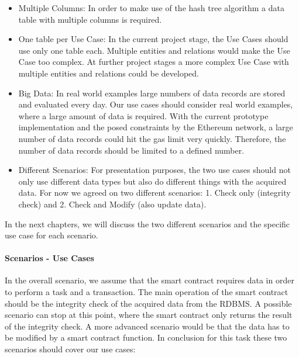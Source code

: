 \begin{itemize}
\item Multiple Columns:
In order to make use of the hash tree algorithm a data table with multiple columns is required.
\item One table per Use Case:
In the current project stage, the Use Cases should use only one table each. Multiple entities and relations would make the Use Case too complex. At further project stages a more complex Use Case with multiple entities and relations could be developed.
\item Big Data:
In real world examples large numbers of data records are stored and evaluated every day. Our use cases should consider real world examples, where a large amount of data is required. With the current prototype implementation and the posed constraints by the Ethereum network, a large number of data records could hit the gas limit very quickly. Therefore, the number of data records should be limited to a defined number.
\item Different Scenarios:
For presentation purposes, the two use cases should not only use different data types but also do different things with the acquired data. For now we agreed on two different scenarios: 1. Check only (integrity check) and 2. Check and Modify (also update data).
\end{itemize}

In the next chapters, we will discuss the two different scenarios and the specific use case for each scenario.

\paragraph{Scenarios - Use Cases}
In the overall scenario, we assume that the smart contract requires data in order to perform a task and a transaction. The main operation of the smart contract should be the integrity check of the acquired data from the RDBMS. A possible scenario can stop at this point, where the smart contract only returns the result of the integrity check. A more advanced scenario would be that the data has to be modified by a smart contract function. In conclusion for this task these two scenarios should cover our use cases:




